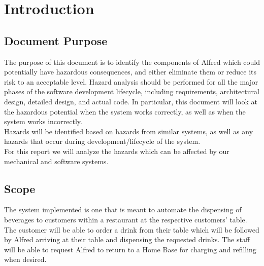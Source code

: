 \documentclass [10pt]{article}
\begin{document}
\pagebreak



\section {Introduction}

\subsection{Document Purpose}
The purpose of this document is to identify the components of Alfred which could potentially have hazardous consequences, and either eliminate them or reduce its risk to an acceptable level. Hazard analysis should be performed for all the major phases of the software development lifecycle, including requirements, architectural design, detailed design, and actual code. In particular, this document will look at the hazardous potential when the system works correctly, as well as when the system works incorrectly. \\ \newline
Hazards will be identified based on hazards from similar systems, as well as any hazards that occur during development/lifecycle of the system.\\ \newline
For this report we will analyze the hazards which can be affected by our mechanical and software systems.

\subsection{Scope}
The system implemented is one that is meant to automate the dispensing of beverages to customers within a restaurant at the respective customers' table. The customer will be able to order a drink from their table which will be followed by Alfred arriving at their table and dispensing the requested drinks. The staff will be able to request Alfred to return to a Home Base for charging and refilling when desired. 
\end{document}

